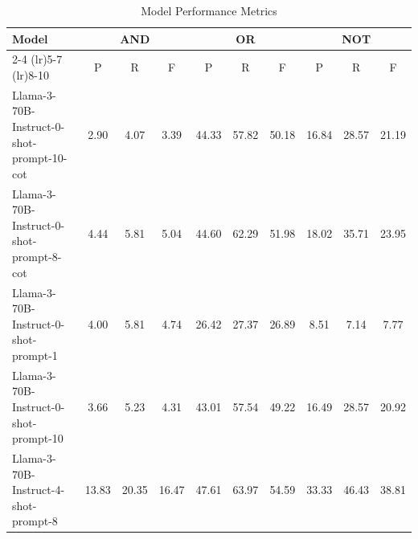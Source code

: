 \begin{table}[h]
\centering
\begin{tabular}{lccccccccc}
\toprule
Model & \multicolumn{3}{c}{AND} & \multicolumn{3}{c}{OR} & \multicolumn{3}{c}{NOT} \\
\cmidrule(lr){2-4}  \cmidrule(lr){5-7}  \cmidrule(lr){8-10}
 & P & R & F & P & R & F & P & R & F \\
\midrule
Llama-3-70B-Instruct-0-shot-prompt-10-cot & 2.90 & 4.07 & 3.39 & 44.33 & 57.82 & 50.18 & 16.84 & 28.57 & 21.19 \\
Llama-3-70B-Instruct-0-shot-prompt-8-cot & 4.44 & 5.81 & 5.04 & 44.60 & 62.29 & 51.98 & 18.02 & 35.71 & 23.95 \\
Llama-3-70B-Instruct-0-shot-prompt-1 & 4.00 & 5.81 & 4.74 & 26.42 & 27.37 & 26.89 & 8.51 & 7.14 & 7.77 \\
Llama-3-70B-Instruct-0-shot-prompt-10 & 3.66 & 5.23 & 4.31 & 43.01 & 57.54 & 49.22 & 16.49 & 28.57 & 20.92 \\
Llama-3-70B-Instruct-4-shot-prompt-8 & 13.83 & 20.35 & 16.47 & 47.61 & 63.97 & 54.59 & 33.33 & 46.43 & 38.81 \\
\bottomrule
\end{tabular}
\caption{Model Performance Metrics}
\label{tab:model_metrics}
\end{table}
